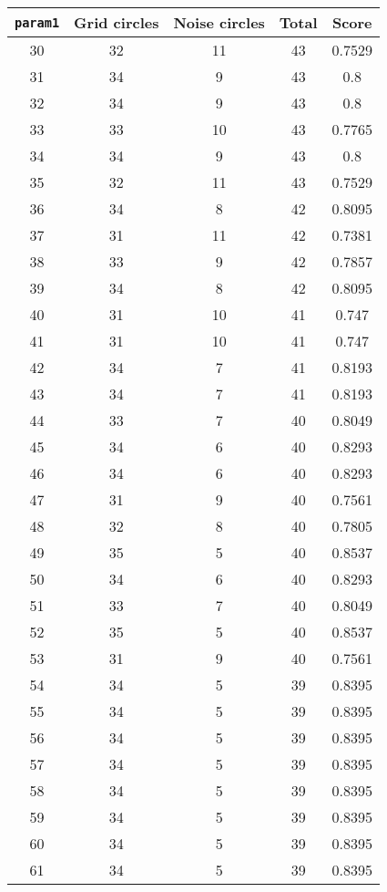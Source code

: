 \documentclass[letterpaper, 12pt]{article}
\begin{document}
\begin{longtable}{|c|c|c|c|c|}
\hline
\textbf{\texttt{param1}} & \textbf{Grid circles} & \textbf{Noise circles} & \textbf{Total} & \textbf{Score} \\
\hline
30 & 32 & 11 & 43 & 0.7529 \\
\hline
31 & 34 & 9 & 43 & 0.8 \\
\hline
32 & 34 & 9 & 43 & 0.8 \\
\hline
33 & 33 & 10 & 43 & 0.7765 \\
\hline
34 & 34 & 9 & 43 & 0.8 \\
\hline
35 & 32 & 11 & 43 & 0.7529 \\
\hline
36 & 34 & 8 & 42 & 0.8095 \\
\hline
37 & 31 & 11 & 42 & 0.7381 \\
\hline
38 & 33 & 9 & 42 & 0.7857 \\
\hline
39 & 34 & 8 & 42 & 0.8095 \\
\hline
40 & 31 & 10 & 41 & 0.747 \\
\hline
41 & 31 & 10 & 41 & 0.747 \\
\hline
42 & 34 & 7 & 41 & 0.8193 \\
\hline
43 & 34 & 7 & 41 & 0.8193 \\
\hline
44 & 33 & 7 & 40 & 0.8049 \\
\hline
45 & 34 & 6 & 40 & 0.8293 \\
\hline
46 & 34 & 6 & 40 & 0.8293 \\
\hline
47 & 31 & 9 & 40 & 0.7561 \\
\hline
48 & 32 & 8 & 40 & 0.7805 \\
\hline
49 & 35 & 5 & 40 & 0.8537 \\
\hline
50 & 34 & 6 & 40 & 0.8293 \\
\hline
51 & 33 & 7 & 40 & 0.8049 \\
\hline
52 & 35 & 5 & 40 & 0.8537 \\
\hline
53 & 31 & 9 & 40 & 0.7561 \\
\hline
54 & 34 & 5 & 39 & 0.8395 \\
\hline
55 & 34 & 5 & 39 & 0.8395 \\
\hline
56 & 34 & 5 & 39 & 0.8395 \\
\hline
57 & 34 & 5 & 39 & 0.8395 \\
\hline
58 & 34 & 5 & 39 & 0.8395 \\
\hline
59 & 34 & 5 & 39 & 0.8395 \\
\hline
60 & 34 & 5 & 39 & 0.8395 \\
\hline
61 & 34 & 5 & 39 & 0.8395 \\

\end{longtable}
\end{document}
